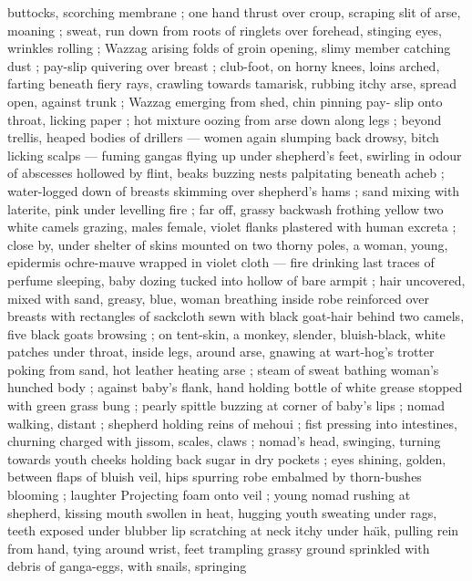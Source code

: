 buttocks, scorching membrane ; one hand thrust over croup, scraping 
slit of arse, moaning ; sweat, run down from roots of ringlets over 
forehead, stinging eyes, wrinkles rolling ; Wazzag arising {\col} folds of 
groin opening, slimy member catching dust ; pay-slip quivering over 
breast ; club-foot, on horny knees, loins arched, farting beneath 
fiery rays, crawling towards tamarisk, rubbing itchy arse, spread 
open, against trunk ; Wazzag emerging from shed, chin pinning pay- 
slip onto throat, licking paper ; hot mixture oozing from arse down 
along legs ; beyond trellis, heaped bodies of drillers --- women 
again slumping back drowsy, bitch licking scalps --- fuming {\semifourslash}
gangas flying up under shepherd's feet, swirling in odour of 
abscesses hollowed by flint, beaks buzzing {\col} nests palpitating 
beneath acheb ; water-logged down of breasts skimming over 
shepherd's hams ; sand mixing with laterite, pink under levelling fire 
; far off, grassy backwash frothing yellow {\col} two white camels grazing, 
males female, violet flanks plastered with human excreta ; close by, 
under shelter of skins mounted on two thorny poles, a woman, 
young, epidermis ochre-mauve wrapped in violet cloth --- fire 
drinking last traces of perfume {\dashcom} sleeping, baby dozing tucked into 
hollow of bare armpit ; hair uncovered, mixed with sand, greasy, 
blue, woman breathing inside robe reinforced over breasts with 
rectangles of sackcloth sewn with black goat-hair {\col} behind two 
camels, five black goats browsing ; on tent-skin, a monkey, slender, 
bluish-black, white patches under throat, inside legs, around arse, 
gnawing at wart-hog's trotter poking from sand, hot leather heating 
arse ; steam of sweat bathing woman's hunched body ; against 
baby's flank, hand holding bottle of white grease stopped with green 
grass bung ; pearly spittle buzzing at corner of baby's lips ; nomad 
walking, distant ; shepherd holding reins of mehoui ; fist pressing 
into intestines, churning charged with jissom, scales, claws ; nomad's 
head, swinging, turning towards youth {\col} cheeks holding back sugar 
in dry pockets ; eyes shining, golden, between flaps of bluish veil, 
hips spurring robe embalmed by thorn-bushes blooming ; laughter 
Projecting foam onto veil ; young nomad rushing at shepherd, kissing 
mouth swollen in heat, hugging youth sweating under rags, teeth 
exposed under blubber lip scratching at neck itchy under ha\"{\i}k, 
pulling rein from hand, tying around wrist, feet trampling grassy 
ground sprinkled with debris of ganga-eggs, with snails, springing 
